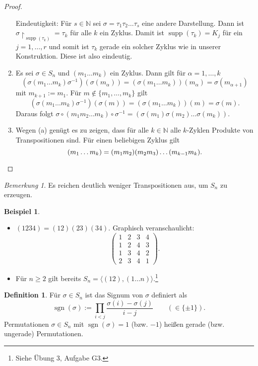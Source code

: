 \documentclass[12pt]{scrartcl} %
\DeclareMathOperator{\sgn}{sgn}
\DeclareMathOperator{\supp}{supp}
\newcommand{\Inv}[1]{#1^{-1}}
\theoremstyle{definition}
\newtheorem*{defn}{Definition}
\newtheorem{ex}{Beispiel}
\theoremstyle{remark}
\newtheorem*{nb}{Bemerkung}
\begin{document}
\begin{proof}
\begin{enumerate}[label=(\alph*)]
		Eindeutigkeit: Für $s\in\mathbb{N}$ sei $\sigma = \tau_1\tau_2\dots\tau_s$ eine andere Darstellung.
		Dann ist $\sigma\upharpoonright_{\supp(\tau_k)} = \tau_k$ für alle $k$ ein Zyklus.
		Damit ist $\supp(\tau_k) = K_j$ für ein $j=1,\dots,r$ und somit ist $\tau_k$ gerade ein solcher Zyklus wie in unserer Konstruktion.
		Diese ist also eindeutig.
	\item Es sei $\sigma\in S_n$ und $(m_1\dots m_k)$ ein Zyklus.
		Dann gilt für $\alpha = 1,\dots,k$
		\[(\sigma(m_1 \dots m_k)\Inv\sigma)(\sigma(m_{\alpha}))=(\sigma(m_1 \dots m_k))(m_{\alpha}) = \sigma(m_{\alpha+1})\]
		mit $m_{k+1}:=m_1$.
		Für $m\notin \{m_1, \dots, m_k\}$ gilt
		\[(\sigma(m_1 \dots m_k) \sigma^{-1}) (\sigma(m)) = ( \sigma(m_1 \dots m_k) )(m) = \sigma(m).\]
		Daraus folgt $\sigma\circ(m_1m_2\dots m_k)\circ\sigma^{-1} = (\sigma(m_1)\sigma(m_2)\dots\sigma(m_k))$.
	\item Wegen (a) genügt es zu zeigen, dass für alle $k\in\mathbb{N}$ alle $k$-Zyklen Produkte von Transpositionen sind.
		Für einen beliebigen Zyklus gilt
		\[(m_1\dots m_k) = (m_1m_2)(m_2m_3)\dots (m_{k-1}m_k).\qedhere\]
	\end{enumerate}
\end{proof}

\begin{nb}
	Es reichen deutlich weniger Transpositionen aus, um $S_n$ zu erzeugen.
\end{nb}

\begin{ex}
	\begin{itemize}
	\item $(1234) = (12)(23)(34)$. Graphisch veranschaulicht:
		\[\begin{pmatrix}
		1 & 2 & 3 & 4 \\ %
		1 & 2 & 4 & 3 \\ %
		1 & 3 & 4 & 2 \\ %
		2 & 3 & 4 & 1
		\end{pmatrix}.\]
	\item Für $n \geq 2$ gilt bereits $S_n = \langle (1 2) , (1 \dots n) \rangle$.\footnote{Siehe Übung 3, Aufgabe G3.}
	\end{itemize}
\end{ex}

\begin{defn}
	Für $\sigma\in S_n$ ist das Signum von $\sigma$ definiert als
	\[\sgn(\sigma) := \prod_{i<j}\frac{\sigma(i)-\sigma(j)}{i-j}\qquad(\in\{\pm 1\}).\]
	Permutationen $\sigma\in S_n$ mit $\sgn(\sigma) = 1$ (bzw. $-1$) heißen gerade (bzw. ungerade) Permutationen.
\end{defn}
\end{document}
